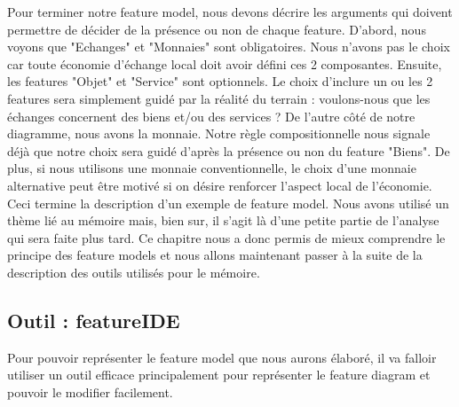 Pour terminer notre feature model,  nous devons décrire les arguments qui doivent permettre de décider de la présence ou non de chaque feature.  D'abord,  nous voyons que "Echanges" et "Monnaies" sont obligatoires.  Nous n'avons pas le choix car toute économie d'échange local doit avoir défini ces 2 composantes.  Ensuite,  les features "Objet" et "Service" sont optionnels.  Le choix d'inclure un ou les 2 features sera simplement guidé par la réalité du terrain : voulons-nous que les échanges concernent des biens et/ou des services ?  De l'autre côté de notre diagramme,  nous avons la monnaie.  Notre règle compositionnelle nous signale déjà que notre choix sera guidé d'après la présence ou non du feature "Biens".  De plus,  si nous utilisons une monnaie conventionnelle,  le choix d'une monnaie alternative peut être motivé si on désire renforcer l'aspect local de l'économie.  \\

Ceci termine la description d'un exemple de feature model.  Nous avons utilisé un thème lié au mémoire mais,  bien sur,  il s'agit là d'une petite partie de l'analyse qui sera faite plus tard.  Ce chapitre nous a donc permis de mieux comprendre le principe des feature models et nous allons maintenant passer à la suite de la description des outils utilisés pour le mémoire. 

\subsection{Outil : featureIDE}

Pour pouvoir représenter le feature model que nous aurons élaboré,  il va falloir utiliser un outil efficace principalement pour représenter le feature diagram et pouvoir le modifier facilement. 


